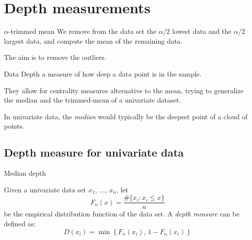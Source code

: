 \pagebreak
\section{Depth measurements}

\begin{definition}{$\alpha$-trimmed mean}
    We remove from the data set the $\alpha/2$ lowest data
    and the $\alpha/2$ largest data, and compute
    the mean of the remaining data.
    \tcblower
    \begin{note}
        The aim is to remove the outliers.
    \end{note}
\end{definition}

\begin{definition}{Data Depth}{}
    a measure of how deep a data point is in the sample.

    They allow for centrality measures alternative to the mean, trying
    to generalize the median and the trimmed-mean
    of a univariate dataset.

    \tcblower

    \begin{note}
        In univariate data, the \emph{median} would typically be the deepest point
        of a cloud of points.
    \end{note}
\end{definition}

\subsection{Depth measure for univariate data}

\begin{definition}{Median depth}{}

Given a univariate data set $x_1,\, \dots,\, x_n$, let
\begin{equation*}
    F_n(x) = \frac{\#\{x_i: x_i \leq x\}}{n} \tag{Empirical distribution function}
\end{equation*}
be the empirical distribution function of the data set. A \emph{depth measure} can
be defined as:
\begin{equation*}
    D(x_i) = \min\left\{ F_n(x_i),\, 1 - F_n(x_i) \right\} \tag{depth measure}
\end{equation*}
\end{definition}

